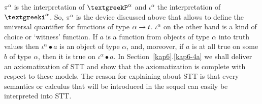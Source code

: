 $\pi^{\alpha}$ is the interpretation of $\GPi^{\alpha}$ and 
$\iota^{\alpha}$ the interpretation of $\Giota^{\alpha}$. So,
$\pi^{\alpha}$ is the device discussed above that allows to define 
the universal quantifier for functions of type $\alpha \rightarrow t$.
$\iota^{\alpha}$ on the other hand is a kind of choice or `witness' 
function. If $a$ is a function from objects of type $\alpha$ into 
truth values then $\iota^{\alpha} \bullet a$ is an object of type
$\alpha$, and, moreover, if $a$ is at all true on some $b$ of type
$\alpha$, then it is true on $\iota^{\alpha} \bullet a$. In 
Section~\ref{kap6}.\ref{kap6-4a} we shall deliver 
an axiomatization of STT and show that the 
axiomatization is complete with respect to these models. The reason 
for explaining about STT is that every semantics or calculus that
will be introduced in the sequel can easily be interpreted into
STT.

